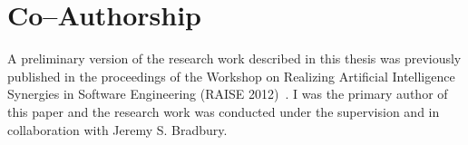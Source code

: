 \chapter*{Co--Authorship}
A preliminary version of the research work described in this thesis was previously published in the proceedings of the Workshop on Realizing Artificial Intelligence Synergies in Software Engineering (RAISE 2012)~\cite{JB12}. I was the primary author of this paper and the research work was conducted under the supervision and in collaboration with Jeremy S. Bradbury.
